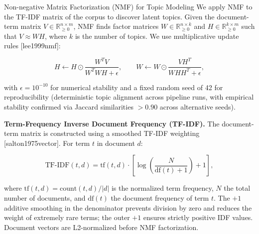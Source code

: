 \documentclass[
  ignorenonframetext,
]{beamer}
\providecommand{\citep}[1]{[#1]}
\begin{document}
\begin{frame}[allowframebreaks]{Non-negative Matrix Factorization (NMF)
for Topic Modeling \label{sec:appendix_nmf}}
\protect{}\label{non-negative-matrix-factorization-nmf-for-topic-modeling}
We apply NMF to the TF-IDF matrix of the corpus to discover latent
topics. Given the document-term matrix
\(V \in \mathbb{R}^{n \times m}_{\geq 0}\), NMF finds factor matrices
\(W \in \mathbb{R}^{n \times k}_{\geq 0}\) and
\(H \in \mathbb{R}^{k \times m}_{\geq 0}\) such that \(V \approx W H\),
where \(k\) is the number of topics. We use multiplicative update rules
\citep{lee1999nmf}:

\begin{equation}
H \leftarrow H \odot \frac{W^T V}{W^T W H + \epsilon}, \qquad W \leftarrow W \odot \frac{V H^T}{W H H^T + \epsilon}, \label{eq:nmf_update}
\end{equation}

with \(\epsilon = 10^{-10}\) for numerical stability and a fixed random
seed of 42 for reproducibility (deterministic topic alignment across
pipeline runs, with empirical stability confirmed via Jaccard
similarities \(> 0.90\) across alternative seeds).

\textbf{Term-Frequency Inverse Document Frequency (TF-IDF).} The
document-term matrix is constructed using a smoothed TF-IDF weighting
\citep{salton1975vector}. For term \(t\) in document \(d\):

\begin{equation}
\text{TF-IDF}(t, d) = \text{tf}(t, d) \cdot \left[\log\!\left(\frac{N}{\text{df}(t) + 1}\right) + 1\right], \label{eq:tfidf}
\end{equation}

where \(\text{tf}(t, d) = \text{count}(t,d) / |d|\) is the normalized
term frequency, \(N\) the total number of documents, and
\(\text{df}(t)\) the document frequency of term \(t\). The \(+1\)
additive smoothing in the denominator prevents division by zero and
reduces the weight of extremely rare terms; the outer \(+1\) ensures
strictly positive IDF values. Document vectors are L2-normalized before
NMF factorization.

\FloatBarrier
\end{frame}
\end{document}
